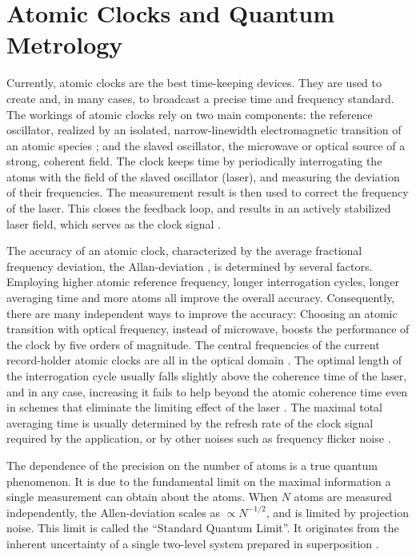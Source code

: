 \section{Atomic Clocks and Quantum Metrology}
Currently, atomic clocks are the best time-keeping devices. They are
used to create and, in many cases, to broadcast a precise time and
frequency standard. The workings of atomic clocks rely on two main components: the
reference oscillator, realized by an isolated, narrow-linewidth electromagnetic
transition of an atomic species \cite{Derevianko2011}; and the slaved
oscillator, the microwave or optical source of a strong, coherent field. The
clock keeps time by periodically interrogating the atoms with the field of the
slaved oscillator (laser), and measuring the deviation of their frequencies.
The measurement result is then used to correct the frequency of the laser.
This closes the feedback loop, and results in an actively stabilized laser
field, which serves as the clock signal \cite{Diddams2004}.

The accuracy of an atomic clock, characterized by the average fractional
frequency deviation, the Allan-deviation \cite{Allan1966, Rutman1978}, is
determined by several factors. Employing higher atomic reference frequency,
longer interrogation cycles, longer averaging time and more atoms all improve
the overall accuracy. Consequently, there are many independent ways to improve
the accuracy:
Choosing an atomic transition with optical frequency, instead of microwave,
boosts the performance of the clock by five orders of magnitude. The central
frequencies of the current record-holder atomic clocks are all in the optical
domain \cite{Ludlow2015}. The optimal length of the interrogation cycle usually falls
slightly above the coherence time of the laser, and in any case, increasing it
fails to help beyond the atomic coherence time even in schemes that eliminate
the limiting effect of the laser \cite{Borregaard2013, Rosenband2013}. The
maximal total averaging time is usually determined by the refresh rate of the
clock signal required by the application, or by other noises such as frequency
flicker noise \cite{Barnes1966}.

The dependence of the precision on the number of atoms is a true quantum
phenomenon.
It is due to the fundamental limit on the maximal information a single
measurement can obtain about the atoms. When $N$ atoms are measured
independently, the Allen-deviation scales as $\propto N^{-1/2}$, and is limited
by projection noise. This limit is called the ``Standard Quantum Limit''. It
originates from the inherent uncertainty of a single two-level system prepared in superposition \cite{Santarelli1998}.
 
